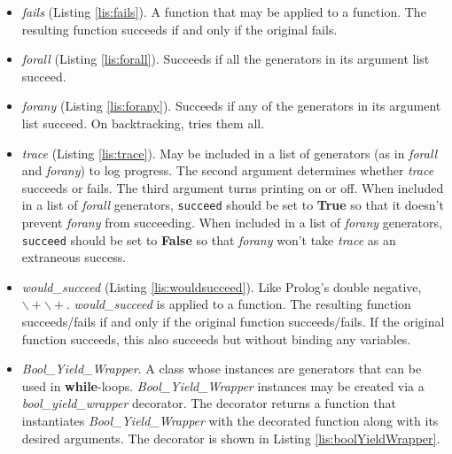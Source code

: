 \begin{itemize}
    \item \textit{fails} (Listing \ref{lis:fails}). A function that may be applied to a function. The resulting function succeeds if and only if the original fails.
    
    \item \textit{forall} (Listing \ref{lis:forall}). Succeeds if all the generators in its argument list succeed.
    
    \item \textit{forany} (Listing \ref{lis:forany}). Succeeds if any of the generators in its argument list succeed. On backtracking, tries them all.
    
    \item \textit{trace} (Listing \ref{lis:trace}). May be included in a list of generators (as in \textit{forall} and \textit{forany}) to log progress. The second argument determines whether \textit{trace} succeeds or fails. The third argument turns printing on or off. When included in a list of \textit{forall} generators, \texttt{succeed} should be set to \textbf{True} so that it doesn't prevent \textit{forany} from succeeding. When included in a list of \textit{forany} generators, \texttt{succeed} should be set to \textbf{False} so that \textit{forany} won't take \textit{trace} as an extraneous success.
    
    \item \textit{would\_succeed} (Listing \ref{lis:wouldsucceed}). Like Prolog's double negative, $\backslash\!\!+ \backslash+$. \textit{would\_succeed} is applied to a function. The resulting function succeeds/fails if and only if the original function succeeds/fails. If the original function succeeds, this also succeeds but without binding any variables. 
    
    \item \textit{Bool\_Yield\_Wrapper}. A class whose instances are generators that can be used in \textbf{while}-loops. \textit{Bool\_Yield\_Wrapper} instances may be created via a \textit{bool\_yield\_wrapper} decorator. The decorator returns a function that instantiates \textit{Bool\_Yield\_Wrapper} with the decorated function along with its desired arguments. The decorator is shown in Listing \ref{lis:boolYieldWrapper}.



\end{itemize}
